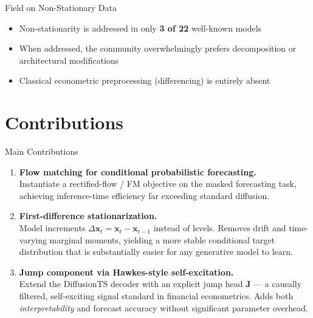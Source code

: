 \documentclass[aspectratio=169,11pt]{beamer}
\begin{document}
\begin{frame}{Field on Non-Stationary Data}
  \begin{block}{}
    \begin{itemize}
      \setlength\itemsep{6pt}
      \item Non-stationarity is addressed in only
            \textbf{3 of 22} well-known models
      \item When addressed, the community overwhelmingly
            prefers decomposition or architectural
            modifications
      \item Classical econometric preprocessing
            (differencing) is entirely absent
    \end{itemize}
  \end{block}
\end{frame}

\section{Contributions}

\begin{frame}{Main Contributions}
  \begin{enumerate}
    \setlength\itemsep{14pt}

    \item \textbf{Flow matching for conditional probabilistic forecasting.}\\
          Instantiate a rectified-flow / FM objective on the masked
          forecasting task, achieving inference-time efficiency
          far exceeding standard diffusion.

    \item \textbf{First-difference stationarization.}\\
          Model increments $\Delta\mathbf{x}_t = \mathbf{x}_t - \mathbf{x}_{t-1}$
          instead of levels. Removes drift and time-varying marginal
          moments, yielding a more stable conditional target distribution
          that is substantially easier for any generative model to learn.

    \item \textbf{Jump component via Hawkes-style self-excitation.}\\
          Extend the DiffusionTS decoder with an explicit jump head
          $\mathbf{J}$ — a causally filtered, self-exciting
          signal standard in financial econometrics. Adds both
          \emph{interpretability} and forecast accuracy without
          significant parameter overhead.
  \end{enumerate}
\end{frame}
\end{document}

